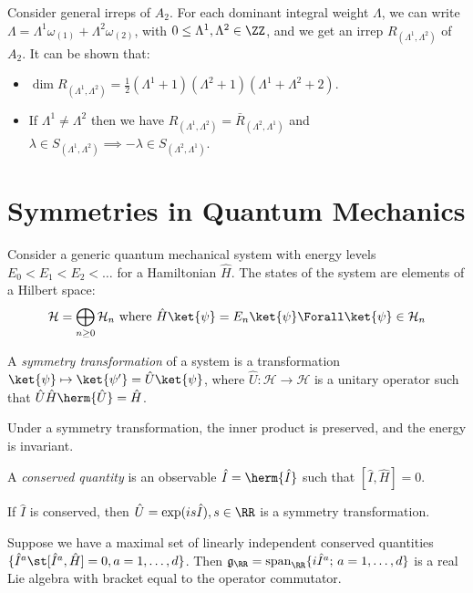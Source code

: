 \documentclass{jknotes}
\begin{document}
\begin{eg}
    Consider general irreps of \(A_2\). For each dominant integral weight \(\Lambda\), we can write \(\Lambda = \Lambda^1\omega_{(1)}+\Lambda^2\omega_{(2)}\), with \(0 \le \Lambda^1,\Lambda^2  \in \ZZ\), and we get an irrep \(R_{(\Lambda^1,\Lambda^2)}\) of \(A_2\). It can be shown that:
    \begin{itemize}
        \item \(\dim R_{(\Lambda^1,\Lambda^2)} = \frac{1}{2}(\Lambda^1+1)(\Lambda^2+1)(\Lambda^1+\Lambda^2+2)\).
        \item If \(\Lambda^1 \ne \Lambda^2\) then we have \(R_{(\Lambda^1,\Lambda^2)} = \bar{R}_{(\Lambda^2,\Lambda^1)}\) and \(\lambda \in S_{(\Lambda^1,\Lambda^2)} \implies -\lambda \in S_{(\Lambda^2,\Lambda^1)}\).
    \end{itemize}
\end{eg}

\section{Symmetries in Quantum Mechanics}
Consider a generic quantum mechanical system with energy levels \(E_0 < E_1 < E_2 < \dots\) for a Hamiltonian \(\hat{H}\). The states of the system are elements of a Hilbert space:
\begin{equation}
    \mathcal{H} = \bigoplus_{n\ge0}\mathcal{H}_n \text{ where } \hat{H}\ket{\psi} = E_n\ket{\psi} \Forall \ket{\psi}\in\mathcal{H}_n
\end{equation}

\begin{defn}
    A \emph{symmetry transformation} of a system is a transformation \(\ket{\psi} \mapsto \ket{\psi'} = \hat{U}\ket{\psi}\), where \(\hat{U}:\mathcal{H}\rightarrow\mathcal{H}\) is a unitary operator such that \(\hat{U}\hat{H}\herm{\hat{U}} = \hat{H}\).
\end{defn}

Under a symmetry transformation, the inner product is preserved, and the energy is invariant.

\begin{defn}
    A \emph{conserved quantity} is an observable \(\hat{I}=\herm{\hat{I}}\) such that \([\hat{I},\hat{H}] = 0\).
\end{defn}

If \(\hat{I}\) is conserved, then \(\hat{U} = \exp(is\hat{I}), s \in \RR\) is a symmetry transformation.

Suppose we have a maximal set of linearly independent conserved quantities \(\{\hat{I}^a \st [\hat{I}^a,\hat{H}] = 0, a = 1,\dots,d\}\). Then \(\mathfrak{g}_\RR=\operatorname{span}_\RR\{i\hat{I}^a;\,a=1,\dots,d\}\) is a real Lie algebra with bracket equal to the operator commutator.
\end{document}
